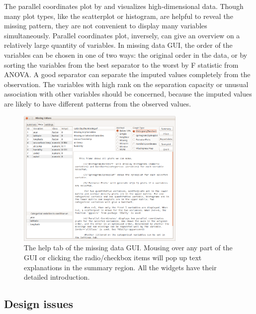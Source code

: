 \documentclass[article]{jss}
\begin{document}
The parallel coordinates plot by \citet{inselberg1985plane} and \citet{wegman1990hyperdimensional} visualizes high-dimensional data. Though many plot types, like the scatterplot or histogram, are helpful to reveal the missing pattern, they are not convenient to display many variables simultaneously. Parallel coordinates plot, inversely, can give an overview on a relatively large quantity of variables. In missing data GUI, the order of the variables can be chosen in one of two ways: the original order in the data, or by sorting the variables from the best separator to the worst by F statistic from ANOVA. A good separator can separate the imputed values completely from the observation. The variables with high rank on the separation capacity or unusual association with other variables should be concerned, because the imputed values are likely to have different patterns from the observed values.


\begin{center}
\begin{figure}[h]
\begin{centering}
\includegraphics[width=0.72\textwidth]{graph/fig1-GUI-tab2}
\par\end{centering}
\caption{The help tab of the missing data GUI. Mousing over any part of the GUI or clicking the radio/checkbox items will pop up text explanations in the summary region. All the widgets have their detailed introduction.}
\label{fig: missingGUI-help}
\end{figure}
\par\end{center}


\subsection{Design issues}
\end{document}
